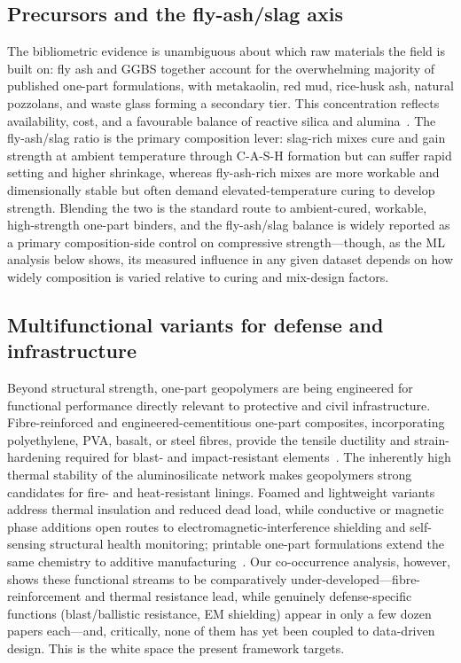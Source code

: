 \documentclass[materials,article,submit,pdftex,moreauthors]{Definitions/mdpi}
\begin{document}
\subsection{Precursors and the fly-ash/slag axis}

The bibliometric evidence is unambiguous about which raw materials the field is built on: fly ash and GGBS together account for the overwhelming majority of published one-part formulations, with metakaolin, red mud, rice-husk ash, natural pozzolans, and waste glass forming a secondary tier. This concentration reflects availability, cost, and a favourable balance of reactive silica and alumina~\cite{ref15,ref18}. The fly-ash/slag ratio is the primary composition lever: slag-rich mixes cure and gain strength at ambient temperature through C-A-S-H formation but can suffer rapid setting and higher shrinkage, whereas fly-ash-rich mixes are more workable and dimensionally stable but often demand elevated-temperature curing to develop strength. Blending the two is the standard route to ambient-cured, workable, high-strength one-part binders, and the fly-ash/slag balance is widely reported as a primary composition-side control on compressive strength---though, as the ML analysis below shows, its measured influence in any given dataset depends on how widely composition is varied relative to curing and mix-design factors.

\subsection{Multifunctional variants for defense and infrastructure}

Beyond structural strength, one-part geopolymers are being engineered for functional performance directly relevant to protective and civil infrastructure. Fibre-reinforced and engineered-cementitious one-part composites, incorporating polyethylene, PVA, basalt, or steel fibres, provide the tensile ductility and strain-hardening required for blast- and impact-resistant elements~\cite{ref19,ref22}. The inherently high thermal stability of the aluminosilicate network makes geopolymers strong candidates for fire- and heat-resistant linings. Foamed and lightweight variants address thermal insulation and reduced dead load, while conductive or magnetic phase additions open routes to electromagnetic-interference shielding and self-sensing structural health monitoring; printable one-part formulations extend the same chemistry to additive manufacturing~\cite{ref21}. Our co-occurrence analysis, however, shows these functional streams to be comparatively under-developed---fibre-reinforcement and thermal resistance lead, while genuinely defense-specific functions (blast/ballistic resistance, EM shielding) appear in only a few dozen papers each---and, critically, none of them has yet been coupled to data-driven design. This is the white space the present framework targets.
\end{document}
